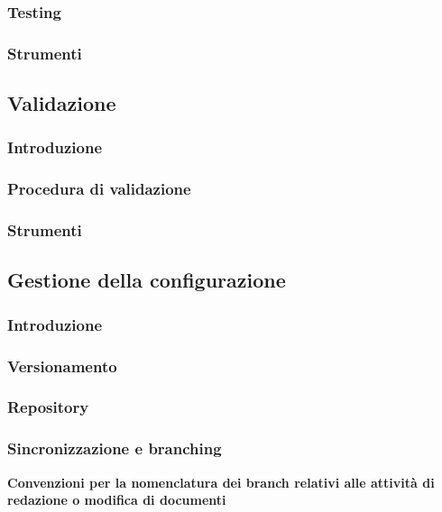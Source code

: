 \begin{itemize}
\subsubsection{Testing}


\subsubsection{Strumenti}
\subsection{Validazione}
\subsubsection{Introduzione}
\subsubsection{Procedura di validazione}
\subsubsection{Strumenti}
\subsection{Gestione della configurazione}
\subsubsection{Introduzione}
\subsubsection{Versionamento}
\subsubsection{Repository}
\subsubsection{Sincronizzazione e branching}

\textbf{Convenzioni per la nomenclatura dei branch relativi alle attività di redazione o modifica di documenti} \label{convenzioni_nomenclatura}


\end{itemize}
